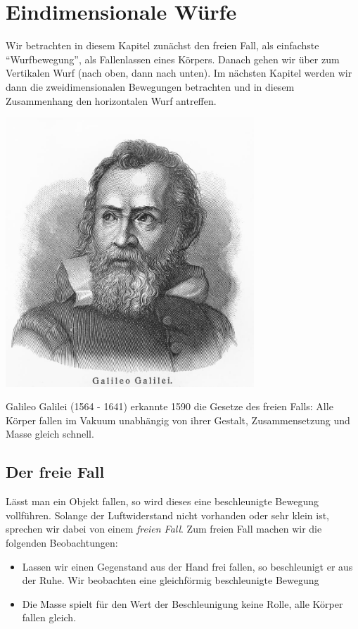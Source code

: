 \section{Eindimensionale Würfe}
Wir betrachten in diesem Kapitel zunächst den freien Fall, als einfachste ``Wurfbewegung'', als Fallenlassen eines Körpers. Danach gehen wir über zum Vertikalen Wurf (nach oben, dann nach unten). Im nächsten Kapitel werden wir dann die zweidimensionalen Bewegungen betrachten und in diesem Zusammenhang den horizontalen Wurf antreffen.
\begin{marginfigure}
    \includegraphics[width=0.7\textwidth]{Bilder/galileo.jpg}
    \label{fig:geoidfig}
    \caption{Galileo Galilei (1564 - 1641) erkannte 1590 die Gesetze des freien Falls: Alle Körper fallen im Vakuum unabhängig von ihrer Gestalt, Zusammensetzung und Masse gleich schnell.}
\end{marginfigure}
\subsection{Der freie Fall}
Lässt man ein Objekt fallen, so wird dieses eine beschleunigte Bewegung vollführen. Solange der Luftwiderstand nicht vorhanden oder sehr klein ist, sprechen wir dabei von einem \textit{freien Fall}. Zum freien Fall machen wir die folgenden Beobachtungen:
\begin{itemize}
\item Lassen wir einen Gegenstand aus der Hand frei fallen, so beschleunigt er aus der Ruhe. Wir beobachten eine gleichförmig beschleunigte Bewegung
\item Die Masse spielt für den Wert der Beschleunigung keine Rolle, alle Körper fallen gleich.
\end{itemize}

